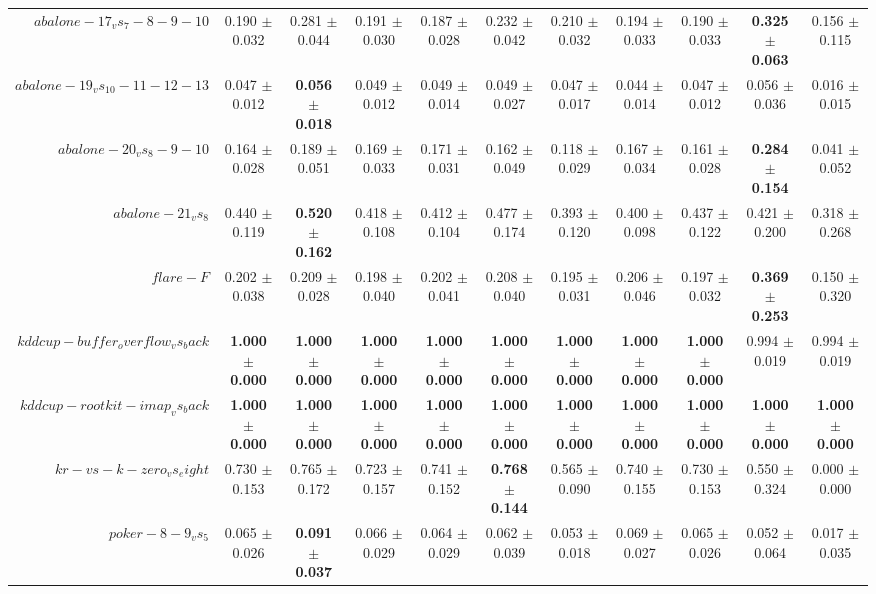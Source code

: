 \begin{table}[!ht]
{\begin{tabular}{r c c c c c c c c c c}
$abalone-17_vs_7-8-9-10$ & 0.190 $\pm$ 0.032 & 0.281 $\pm$ 0.044 & 0.191 $\pm$ 0.030 & 0.187 $\pm$ 0.028 & 0.232 $\pm$ 0.042 & 0.210 $\pm$ 0.032 & 0.194 $\pm$ 0.033 & 0.190 $\pm$ 0.033 & \textbf{0.325 $\pm$ 0.063} & 0.156 $\pm$ 0.115 \\
$abalone-19_vs_10-11-12-13$ & 0.047 $\pm$ 0.012 & \textbf{0.056 $\pm$ 0.018} & 0.049 $\pm$ 0.012 & 0.049 $\pm$ 0.014 & 0.049 $\pm$ 0.027 & 0.047 $\pm$ 0.017 & 0.044 $\pm$ 0.014 & 0.047 $\pm$ 0.012 & 0.056 $\pm$ 0.036 & 0.016 $\pm$ 0.015 \\
$abalone-20_vs_8-9-10$ & 0.164 $\pm$ 0.028 & 0.189 $\pm$ 0.051 & 0.169 $\pm$ 0.033 & 0.171 $\pm$ 0.031 & 0.162 $\pm$ 0.049 & 0.118 $\pm$ 0.029 & 0.167 $\pm$ 0.034 & 0.161 $\pm$ 0.028 & \textbf{0.284 $\pm$ 0.154} & 0.041 $\pm$ 0.052 \\
$abalone-21_vs_8$ & 0.440 $\pm$ 0.119 & \textbf{0.520 $\pm$ 0.162} & 0.418 $\pm$ 0.108 & 0.412 $\pm$ 0.104 & 0.477 $\pm$ 0.174 & 0.393 $\pm$ 0.120 & 0.400 $\pm$ 0.098 & 0.437 $\pm$ 0.122 & 0.421 $\pm$ 0.200 & 0.318 $\pm$ 0.268 \\
$flare-F$ & 0.202 $\pm$ 0.038 & 0.209 $\pm$ 0.028 & 0.198 $\pm$ 0.040 & 0.202 $\pm$ 0.041 & 0.208 $\pm$ 0.040 & 0.195 $\pm$ 0.031 & 0.206 $\pm$ 0.046 & 0.197 $\pm$ 0.032 & \textbf{0.369 $\pm$ 0.253} & 0.150 $\pm$ 0.320 \\
$kddcup-buffer_overflow_vs_back$ & \textbf{1.000 $\pm$ 0.000} & \textbf{1.000 $\pm$ 0.000} & \textbf{1.000 $\pm$ 0.000} & \textbf{1.000 $\pm$ 0.000} & \textbf{1.000 $\pm$ 0.000} & \textbf{1.000 $\pm$ 0.000} & \textbf{1.000 $\pm$ 0.000} & \textbf{1.000 $\pm$ 0.000} & 0.994 $\pm$ 0.019 & 0.994 $\pm$ 0.019 \\
$kddcup-rootkit-imap_vs_back$ & \textbf{1.000 $\pm$ 0.000} & \textbf{1.000 $\pm$ 0.000} & \textbf{1.000 $\pm$ 0.000} & \textbf{1.000 $\pm$ 0.000} & \textbf{1.000 $\pm$ 0.000} & \textbf{1.000 $\pm$ 0.000} & \textbf{1.000 $\pm$ 0.000} & \textbf{1.000 $\pm$ 0.000} & \textbf{1.000 $\pm$ 0.000} & \textbf{1.000 $\pm$ 0.000} \\
$kr-vs-k-zero_vs_eight$ & 0.730 $\pm$ 0.153 & 0.765 $\pm$ 0.172 & 0.723 $\pm$ 0.157 & 0.741 $\pm$ 0.152 & \textbf{0.768 $\pm$ 0.144} & 0.565 $\pm$ 0.090 & 0.740 $\pm$ 0.155 & 0.730 $\pm$ 0.153 & 0.550 $\pm$ 0.324 & 0.000 $\pm$ 0.000 \\
$poker-8-9_vs_5$ & 0.065 $\pm$ 0.026 & \textbf{0.091 $\pm$ 0.037} & 0.066 $\pm$ 0.029 & 0.064 $\pm$ 0.029 & 0.062 $\pm$ 0.039 & 0.053 $\pm$ 0.018 & 0.069 $\pm$ 0.027 & 0.065 $\pm$ 0.026 & 0.052 $\pm$ 0.064 & 0.017 $\pm$ 0.035 \\

\end{tabular}}
\end{table}
